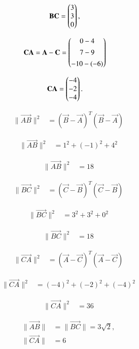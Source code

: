 \documentclass[journal]{IEEEtran}
\begin{document}
\begin{align}
\mathbf{BC} &= \begin{pmatrix}3\\3\\0\end{pmatrix},
\end{align}

\begin{align}
\mathbf{CA} &= \mathbf{A}-\mathbf{C} = \begin{pmatrix}0-4\\[4pt]7-9\\[4pt]-10-(-6)\end{pmatrix}
\end{align}

\begin{align}
\mathbf{CA} &= \begin{pmatrix}-4\\-2\\-4\end{pmatrix}.
\end{align}


\begin{align}
\|\vec{AB}\|^2 &= (\vec{B}-\vec{A})^T(\vec{B}-\vec{A})
\end{align}

\begin{align}
\|\vec{AB}\|^2 &= 1^2 + (-1)^2 + 4^2
\end{align}

\begin{align}
\|\vec{AB}\|^2 &= 18
\end{align}

\begin{align}
\|\vec{BC}\|^2 &= (\vec{C}-\vec{B})^T(\vec{C}-\vec{B})
\end{align}

\begin{align}
\|\vec{BC}\|^2 &= 3^2 + 3^2 + 0^2
\end{align}

\begin{align}
\|\vec{BC}\|^2 &= 18
\end{align}

\begin{align}
\|\vec{CA}\|^2 &= (\vec{A}-\vec{C})^T(\vec{A}-\vec{C})
\end{align}

\begin{align}
\|\vec{CA}\|^2 &= (-4)^2 + (-2)^2 + (-4)^2
\end{align}

\begin{align}
\|\vec{CA}\|^2 &= 36
\end{align}



\begin{align}
\|\vec{AB}\| &= \|\vec{BC}\| = 3\sqrt{2}, \\
\|\vec{CA}\| &= 6
\end{align}
\end{document}

